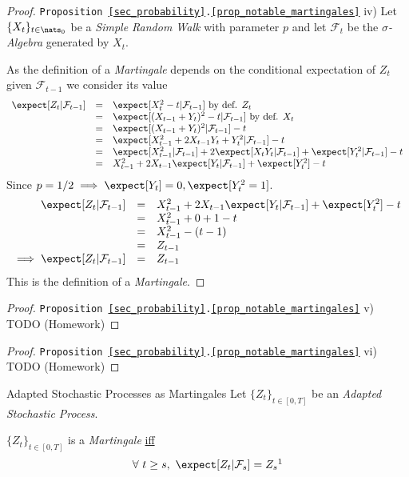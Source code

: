 \documentclass[11pt,a4paper]{article}
\begin{document}
  \begin{proof}{\texttt{Proposition \ref{sec_probability}.\ref{prop_notable_martingales}} iv)}
    Let $\{X_t\}_{t\in\nats_0}$ be a \textit{Simple Random Walk} with parameter $p$ and let $\mathcal{F}_t$ be the \textit{$\sigma$-Algebra} generated by $X_t$.
    \par As the definition of a \textit{Martingale} depends on the conditional expectation of $Z_t$ given $\mathcal{F}_{t-1}$ we consider its value
    \[\begin{array}{rcl}
      \expect[Z_t|\mathcal{F}_{t-1}]&=&\expect[X_t^2-t|\mathcal{F}_{t-1}]\text{ by def. }Z_t\\
      &=&\expect[(X_{t-1}+Y_t)^2-t|\mathcal{F}_{t-1}]\text{ by def. }X_t\\
      &=&\expect[(X_{t-1}+Y_t)^2|\mathcal{F}_{t-1}]-t\\
      &=&\expect[X_{t-1}^2+2X_{t-1}Y_t+Y_t^2|\mathcal{F}_{t-1}]-t\\
      &=&\expect[X_{t-1}^2|\mathcal{F}_{t-1}]+2\expect[X_tY_t|\mathcal{F}_{t-1}]+\expect[Y_t^2|\mathcal{F}_{t-1}]-t\\
      &=&X_{t-1}^2+2X_{t-1}\expect[Y_t|\mathcal{F}_{t-1}]+\expect[Y_t^2]-t\\
    \end{array}\]
    Since $p=1/2\implies \expect[Y_t]=0,\expect[Y_t^2=1]$.
    \[\begin{array}{rcl}
      \expect[Z_t|\mathcal{F}_{t-1}]&=&X_{t-1}^2+2X_{t-1}\expect[Y_t|\mathcal{F}_{t-1}]+\expect[Y_t^2]-t\\
      &=&X_{t-1}^2+0+1-t\\
      &=&X_{t-1}^2-(t-1)\\
      &=&Z_{t-1}\\
      \implies\expect[Z_t|\mathcal{F}_{t-1}]&=&Z_{t-1}
    \end{array}\]
    This is the definition of a \textit{Martingale}.\proved
  \end{proof}

  \begin{proof}{\texttt{Proposition \ref{sec_probability}.\ref{prop_notable_martingales}} v)}
    TODO (Homework)
  \end{proof}

  \begin{proof}{\texttt{Proposition \ref{sec_probability}.\ref{prop_notable_martingales}} vi)}
    TODO (Homework)
  \end{proof}

  \begin{theorem}{Adapted Stochastic Processes as Martingales}\label{the_adapated_stochastic_processes_as_martingales}
    Let $\{Z_t\}_{t\in[0,T]}$ be an \textit{Adapted Stochastic Process}.
    \par $\{Z_t\}_{t\in[0,T]}$ is a \textit{Martingale} \underline{iff}
    \[ \forall\ t\geq s,\  \expect[Z_t|\mathcal{F}_s]=Z_s\footnotemark \]
  \end{theorem}
\end{document}
